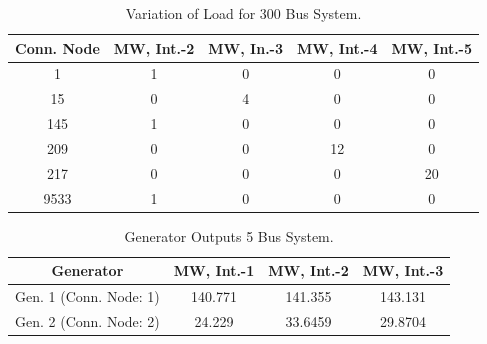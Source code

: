 \documentclass[preprint,12pt,3p]{elsarticle}
\begin{document}
\begin{table}[ht] 

\caption{Variation of Load for 300 Bus System.} %

\centering %

\begin{tabular}{| c | c | c | c | c |} %

\hline\hline %

Conn. Node & MW, Int.-2 & MW, In.-3 & MW, Int.-4  & MW, Int.-5 \\ [0.5ex] %


\hline %

1 &	1 &	0 &	0 &	0 \\ %
\hline
15 &	0 &	4 &	0 &	0 \\ %
\hline
145 &	1 &	0 &	0 &	0 \\ %
\hline
209 &	0 &	0 &	12 &	0 \\ %
\hline
217 &	0 &	0 &	0 &	20 \\ %
\hline
9533 &	1 &	0 &	0 &	0 \\ %

\hline
\end{tabular} 

\label{table:300LASCOPFLoadModified} %

\end{table}
\iffalse
\begin{table}[ht] 

\caption{Generator Outputs 5 Bus System.} %

\centering %

\begin{tabular}{| c | c | c | c |} %

\hline\hline %

Generator & MW, Int.-1 & MW, Int.-2 & MW, Int.-3 \\ [0.5ex] %


\hline %


Gen. 1 (Conn. Node: 1) & 140.771 & 141.355 & 143.131 \\ %
\hline
Gen. 2 (Conn. Node: 2) & 24.229 & 33.6459 & 29.8704 \\ [1ex] %

\hline %
\end{tabular} 

\label{table:5LASCOPFGen} %

\end{table}
\end{document}
